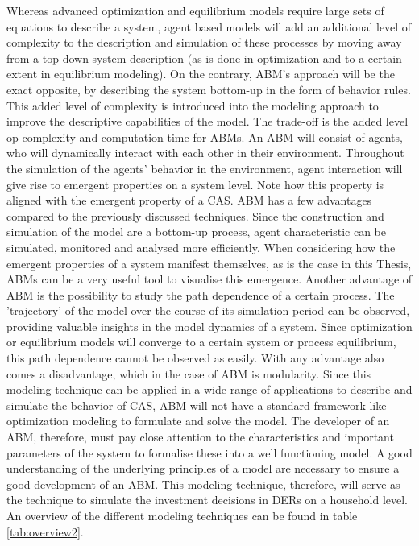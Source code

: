 Whereas advanced optimization and equilibrium models require large sets of equations to describe a system, agent based models will add an additional level of complexity to the description and simulation of these processes by moving away from a top-down system description (as is done in optimization and to a certain extent in equilibrium modeling). On the contrary, ABM's approach will be the exact opposite, by describing the system bottom-up in the form of behavior rules. This added level of complexity is introduced into the modeling approach to improve the descriptive capabilities of the model. The trade-off is the added level op complexity and computation time for ABMs. An ABM will consist of agents, who will dynamically interact with each other in their environment. Throughout the simulation of the agents' behavior in the environment, agent interaction will give rise to emergent properties on a system level. Note how this property is aligned with the emergent property of a CAS. ABM has a few advantages compared to the previously discussed techniques. Since the construction and simulation of the model are a bottom-up process, agent characteristic can be simulated, monitored and analysed more efficiently. When considering how the emergent properties of a system manifest themselves, as is the case in this Thesis, ABMs can be a very useful tool to visualise this emergence. Another advantage of ABM is the possibility to study the path dependence of a certain process. The 'trajectory' of the model over the course of its simulation period can be observed, providing valuable insights in the model dynamics of a system. Since optimization or equilibrium models will converge to a certain system or process equilibrium, this path dependence cannot be observed as easily. With any advantage also comes a disadvantage, which in the case of ABM is modularity. Since this modeling technique can be applied in a wide range of applications to describe and simulate the behavior of CAS, ABM will not have a standard framework like optimization modeling to formulate and solve the model. The developer of an ABM, therefore, must pay close attention to the characteristics and important parameters of the system to formalise these into a well functioning model. A good understanding of the underlying principles of a model are necessary to ensure a good development of an ABM.
\newline \newline \noindent
This modeling technique, therefore, will serve as the technique to simulate the investment decisions in DERs on a household level. An overview of the different modeling techniques can be found in table \ref{tab:overview2}.

